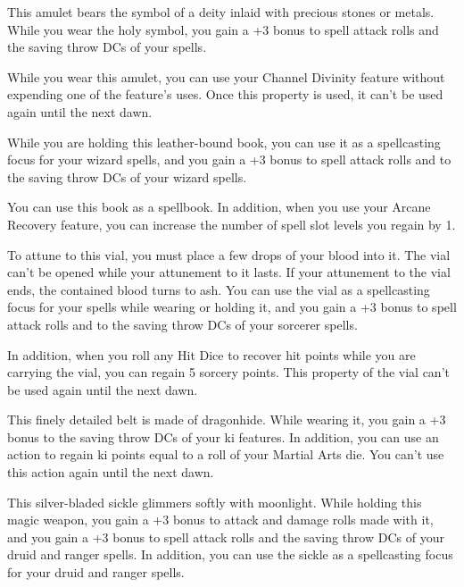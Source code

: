 \documentclass[10pt,a4paper,twoside,bg=print,twocolumn,openany,nodeprecatedcode]{dndbook}
\begin{document}
This amulet bears the symbol of a deity inlaid with precious stones or metals. While you wear the holy symbol, you gain a +3 bonus to spell attack rolls and the saving throw DCs of your spells.

While you wear this amulet, you can use your Channel Divinity feature without expending one of the feature's uses. Once this property is used, it can't be used again until the next dawn.

While you are holding this leather-bound book, you can use it as a spellcasting focus for your wizard spells, and you gain a +3 bonus to spell attack rolls and to the saving throw DCs of your wizard spells.

You can use this book as a spellbook. In addition, when you use your Arcane Recovery feature, you can increase the number of spell slot levels you regain by 1.

To attune to this vial, you must place a few drops of your blood into it. The vial can't be opened while your attunement to it lasts. If your attunement to the vial ends, the contained blood turns to ash. You can use the vial as a spellcasting focus for your spells while wearing or holding it, and you gain a +3 bonus to spell attack rolls and to the saving throw DCs of your sorcerer spells.

In addition, when you roll any Hit Dice to recover hit points while you are carrying the vial, you can regain 5 sorcery points. This property of the vial can't be used again until the next dawn.

This finely detailed belt is made of dragonhide. While wearing it, you gain a +3 bonus to the saving throw DCs of your ki features. In addition, you can use an action to regain ki points equal to a roll of your Martial Arts die. You can't use this action again until the next dawn.

This silver-bladed sickle glimmers softly with moonlight. While holding this magic weapon, you gain a +3 bonus to attack and damage rolls made with it, and you gain a +3 bonus to spell attack rolls and the saving throw DCs of your druid and ranger spells. In addition, you can use the sickle as a spellcasting focus for your druid and ranger spells.
\end{document}
